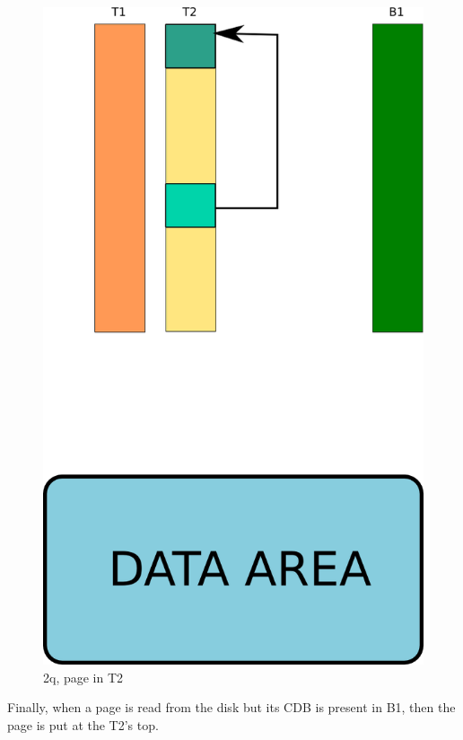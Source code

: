 \begin{figure}[H]
\includegraphics[scale=0.4]{images/2q_03.png}

\caption{2q, page in T2}

\end{figure}

Finally, when a page is read from the disk but its CDB is present in B1, then the page is put at the T2's 
top.\newline

